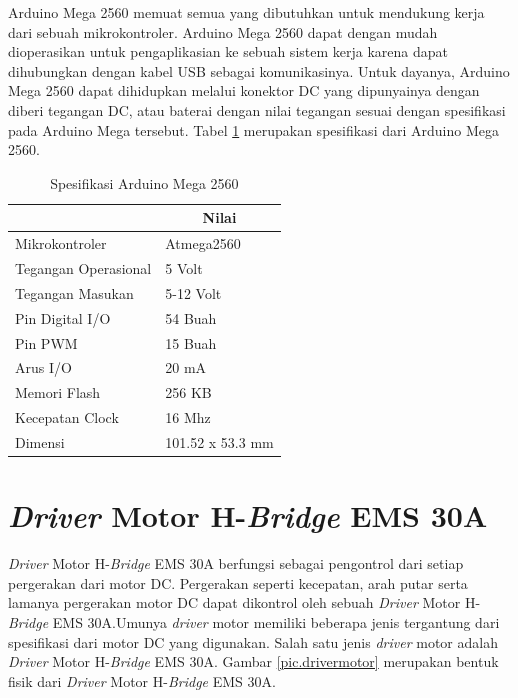 Arduino Mega 2560 memuat semua yang dibutuhkan untuk mendukung kerja dari sebuah mikrokontroler. Arduino Mega 2560 dapat dengan mudah dioperasikan untuk pengaplikasian ke sebuah sistem kerja karena dapat dihubungkan dengan kabel USB sebagai komunikasinya. Untuk dayanya, Arduino Mega 2560 dapat dihidupkan melalui konektor DC yang dipunyainya dengan diberi tegangan DC, atau baterai dengan nilai tegangan sesuai dengan spesifikasi pada Arduino Mega tersebut. Tabel \ref{tbl.arduinomega} merupakan spesifikasi dari Arduino Mega 2560.
\begin{table}[H]
	\centering
	\caption{ Spesifikasi Arduino Mega 2560 }
	\label{tbl.arduinomega}
	\begin{tabular}{|l|l|}
		\hline
		\rowcolor[HTML]{9B9B9B} 
		\multicolumn{1}{|c|}{\cellcolor[HTML]{9B9B9B}Keterangan} & \multicolumn{1}{c|}{\cellcolor[HTML]{9B9B9B}Nilai} \\ \hline
		Mikrokontroler                                           & Atmega2560                                         \\ \hline
		Tegangan Operasional                                     & 5 Volt                                             \\ \hline
		Tegangan Masukan                                         & 5-12 Volt                                          \\ \hline
		Pin Digital I/O                                          & 54 Buah                                            \\ \hline
		Pin PWM                                                  & 15 Buah                                            \\ \hline
		Arus I/O                                                 & 20 mA                                              \\ \hline
		Memori Flash                                             & 256 KB                                             \\ \hline
		Kecepatan Clock                                          & 16 Mhz                                             \\ \hline
		Dimensi                                                  & 101.52 x 53.3 mm                                   \\ \hline
	\end{tabular}
\end{table}
\section{\textit{Driver} Motor H-\textit{Bridge} EMS 30A}
\textit{Driver} Motor H-\textit{Bridge} EMS 30A berfungsi sebagai pengontrol dari setiap pergerakan dari motor DC. Pergerakan seperti kecepatan, arah putar serta lamanya pergerakan motor DC dapat dikontrol oleh sebuah \textit{Driver} Motor H-\textit{Bridge} EMS 30A.Umunya \textit{driver} motor memiliki beberapa jenis tergantung dari spesifikasi dari motor DC yang digunakan. Salah satu jenis \textit{driver} motor adalah \textit{Driver} Motor  H-\textit{Bridge} EMS 30A. Gambar \ref{pic.drivermotor} merupakan bentuk fisik dari \textit{Driver} Motor H-\textit{Bridge} EMS 30A.

